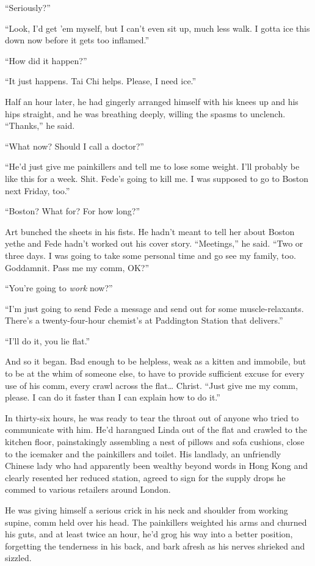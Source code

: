 “Seriously?”

“Look, I’d get ’em myself, but I can’t even sit up, much less walk.
I gotta ice this down now before it gets too inflamed.”

“How did it happen?”

“It just happens. Tai Chi helps. Please, I need ice.”

Half an hour later, he had gingerly arranged himself with his knees
up and his hips straight, and he was breathing deeply, willing the
spasms to unclench. “Thanks,” he said.

“What now? Should I call a doctor?”

“He’d just give me painkillers and tell me to lose some weight.
I’ll probably be like this for a week. Shit. Fede’s going to kill
me. I was supposed to go to Boston next Friday, too.”

“Boston? What for? For how long?”

Art bunched the sheets in his fists. He hadn’t meant to tell her
about Boston yet{\dash}he and Fede hadn’t worked out his cover story.
“Meetings,” he said. “Two or three days. I was going to take some
personal time and go see my family, too. Goddamnit. Pass me my
comm, OK?”

“You’re going to \emph{work} now?”

“I’m just going to send Fede a message and send out for some
muscle-relaxants. There’s a twenty-four-hour chemist’s at
Pad\-dington Station that delivers.”

“I’ll do it, you lie flat.”

And so it began. Bad enough to be helpless, weak as a kitten and
immobile, but to be at the whim of someone else, to have to provide
sufficient excuse for every use of his comm, every crawl across the
flat\ldots{} Christ. “Just give me my comm, please. I can do it faster
than I can explain how to do it.”

In thirty-six hours, he was ready to tear the throat out of anyone
who tried to communicate with him. He’d harangued Linda out of the
flat and crawled to the kitchen floor, painstakingly assembling a
nest of pillows and sofa cushions, close to the icemaker and the
painkillers and toilet. His landlady, an unfriendly Chinese lady
who had apparently been wealthy beyond words in Hong Kong and
clearly resented her reduced station, agreed to sign for the supply
drops he commed to various retailers around London.

He was giving himself a serious crick in his neck and shoulder from
working supine, comm held over his head. The painkillers weighted
his arms and churned his guts, and at least twice an hour, he’d
grog his way into a better position, forgetting the tenderness in
his back, and bark afresh as his nerves shrieked and sizzled.

